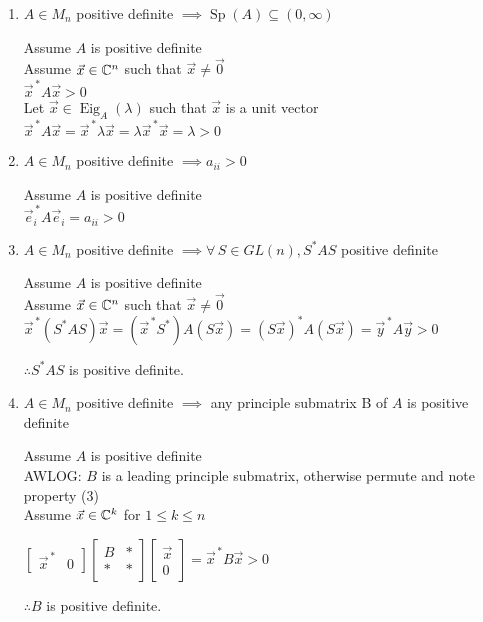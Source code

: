 \documentclass[letterpaper,12pt,fleqn]{article}
\newcommand{\vx}{\vec{x}}
\newcommand{\vxct}{\vx^{\,*}}
\newcommand{\vy}{\vec{y}}
\newcommand{\vyct}{\vy^{\,*}}
\newcommand{\ve}{\vec{e}}
\newcommand{\vect}{\ve^{\,*}}
\newcommand{\vz}{\vec{0}}
\renewcommand{\l}{\lambda}
\DeclareMathOperator{\Sp}{Sp}
\DeclareMathOperator{\Eig}{Eig}
\begin{document}
\begin{properties}
  \listbreak
  \begin{enumerate}
  \item $A\in M_n$ positive definite $\implies \Sp(A)\subseteq(0,\infty)$

    Assume $A$ is positive definite \\
    Assume $\vx\in\C^n$ such that $\vx\ne\vz$ \\
    $\vxct A\vx>0$ \\
    Let $\vx\in\Eig_A(\l)$ such that $\vx$ is a unit vector \\
    $\vxct A\vx=\vxct\l\vx=\l\vxct\vx=\l>0$

  \item $A\in M_n$ positive definite $\implies a_{ii}>0$

    Assume $A$ is positive definite \\
    $\vect_i A\ve_i=a_{ii}>0$

  \item $A\in M_n$ positive definite $\implies \forall\,S\in GL(n),S^*AS$
    positive definite

    Assume $A$ is positive definite \\
    Assume $\vx\in\C^n$ such that $\vx\ne\vz$ \\
    $\vxct(S^*AS)\vx=(\vxct S^*)A(S\vx)=(S\vx)^*A(S\vx)=\vyct A\vy>0$

    $\therefore S^*AS$ is positive definite.

  \item $A\in M_n$ positive definite $\implies$ any principle submatrix B of
    $A$ is positive definite

    Assume $A$ is positive definite \\
    AWLOG: $B$ is a leading principle submatrix, otherwise permute and note
    property (3) \\
    Assume $\vx\in\C^k$ for $1\le k\le n$
    
    $\begin{bmatrix} \vxct & 0 \end{bmatrix}
    \left[\begin{array}{c|c} B & * \\ \hline * & * \end{array}\right]
    \begin{bmatrix} \vx \\ 0 \end{bmatrix}=\vxct B\vx>0$

    $\therefore B$ is positive definite.
  \end{enumerate}
\end{properties}
\end{document}
